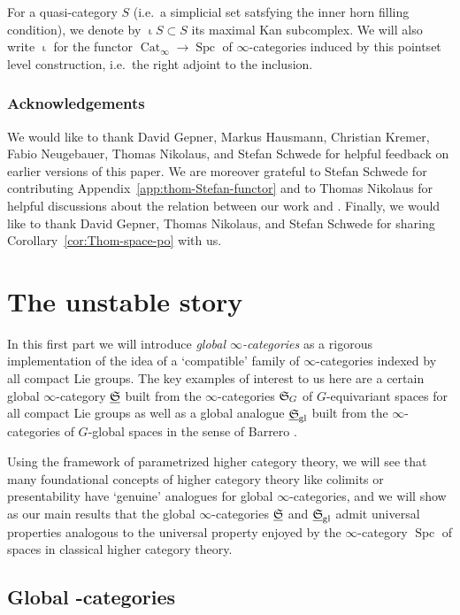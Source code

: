 \documentclass[reqno]{memo-l}
\theoremstyle{mythm}
\theoremstyle{definition}
\numberwithin{equation}{section}
\newcommand{\gl}{\textup{gl}}
\DeclareMathOperator{\Spc}{Spc}
\DeclareMathOperator{\Cat}{Cat}
\DeclareMathOperator{\core}{\iota}
\newcommand{\ulhelper}[2]{\underline{\setbox0=\hbox{$#1#2$}\dp0=0.4pt \box0\relax}}
\newcommand{\ul}[1]{{\mathpalette\ulhelper{#1}}\hbox{\rule[-2pt]{0pt}{0pt}}}
\newcommand{\myS}{{{\mathfrak S\kern-.4pt}}}
\begin{document}
For a quasi-category $S$ (i.e.\ a simplicial set satsfying the inner horn filling condition), we denote by $\core S\subset S$ its maximal Kan subcomplex. We will also write $\core$ for the functor $\Cat_\infty\to\Spc$ of $\infty$-categories induced by this pointset level construction, i.e.\ the right adjoint to the inclusion. 

\subsection*{Acknowledgements} We would like to thank David Gepner, Markus Hausmann, Christian Kremer, Fabio Neugebauer, Thomas Nikolaus, and Stefan Schwede for helpful feedback on earlier versions of this paper. We are moreover grateful to Stefan Schwede for contributing Appendix~\ref{app:thom-Stefan-functor} and to Thomas Nikolaus for helpful discussions about the relation between our work and \cite{gepner-nikolaus}. Finally, we would like to thank David Gepner, Thomas Nikolaus, and Stefan Schwede for sharing Corollary~\ref{cor:Thom-space-po} with us.

\chapter[The unstable story]{The unstable story}
In this first part we will introduce \emph{global $\infty$-categories} as a rigorous implementation of the idea of  a `compatible' family of $\infty$-categories indexed by all compact Lie groups. The key examples of interest to us here are a certain global $\infty$-category $\ul\myS$ built from the $\infty$-categories $\myS_G$ of $G$-equivariant spaces for all compact Lie groups as well as a global analogue $\ul\myS_\gl$ built from the $\infty$-categories of $G$-global spaces in the sense of Barrero \cite{barrero2021}. 

Using the framework of parametrized higher category theory, we will see that many foundational concepts of higher category theory like colimits or presentability have `genuine' analogues for global $\infty$-categories, and we will show as our main results that the global $\infty$-categories $\ul\myS$ and $\ul\myS_\gl$ admit universal properties analogous to the universal property enjoyed by the $\infty$-category $\Spc$ of spaces in classical higher category theory.

\section[Global $\infty$-categories]{Global \texorpdfstring{}{∞}-categories}\label{global-cat}
\end{document}
